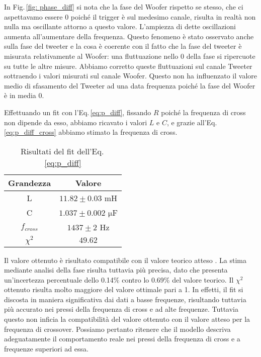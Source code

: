\documentclass[../Relazione_circuiti]{subfiles}
\begin{document}
      In Fig.\,\ref{fig: phase_diff}
      si nota che la fase del Woofer rispetto se stesso, che ci aspettavamo essere 0 poiché il trigger è sul medesimo
      canale, risulta in realtà non nulla ma oscillante attorno a questo valore. L'ampiezza di dette oscillazioni
      aumenta all'aumentare della frequenza. Questo fenomeno è stato osservato anche sulla fase del tweeter e la cosa è
      coerente con il fatto che la fase del tweeter è misurata relativamente al Woofer: una fluttuazione nello 0 della
      fase si ripercuote su tutte le altre misure. Abbiamo corretto queste fluttuazioni sul canale Tweeter sottraendo i
      valori misurati sul canale Woofer. Questo non ha influenzato il valore medio di sfasamento del Tweeter ad una data
      frequenza poiché la fase del Woofer è in media 0.  
  
  
  Effettuando un fit con l'Eq.\,\eqref{eq:p_diff}, fissando $R$
      poiché la frequenza di cross non dipende da esso, abbiamo
      ricavato i valori $L$ e $C$, e grazie all'Eq.\,\eqref{eq:p_diff_cross} abbiamo stimato la frequenza di cross.



  \begin{table}[H]
    \centering

\begin{tabular}{c | c }
Grandezza & Valore  \\
\hline
L & $ 11.82 \pm 0.03 $  mH \\
C & $ 1.037 \pm 0.002 $  $\mathrm{\mu}$F \\
$f_{cross}$ & $ 1437 \pm 2$  Hz \\
$\chi^2$ & $49.62$ 

    \end{tabular}
    \caption{Risultati del fit dell'Eq.\,\eqref{eq:p_diff}}
    \label{tab:fit_phase}

  \end{table}


Il valore ottenuto è risultato compatibile con il valore teorico atteso \theoryF. La stima mediante analisi della fase risulta tuttavia più precisa, dato che presenta un'incertezza percentuale dello 0.14\% contro lo 0.69\% del valore teorico. Il $\chi^2$ ottenuto risulta molto maggiore del valore ottimale pari a 1.
 In effetti, il fit si discosta in maniera significativa dai dati a basse frequenze, risultando tuttavia più accurato nei pressi della frequenza di cross e ad alte frequenze. Tuttavia questo non inficia la compatibilità del valore ottenuto con il valore atteso per la frequenza di crossover.
 Possiamo pertanto ritenere che il modello descriva adeguatamente il comportamento reale nei pressi della frequenza di cross e a frequenze superiori ad essa.
\end{document}
